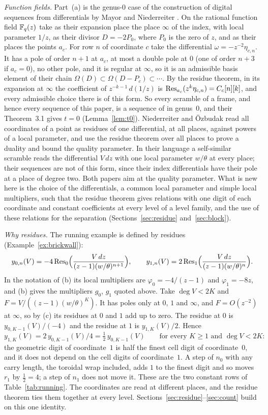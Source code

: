 \emph{Function fields.} Part~(a) is the genus-$0$ case of the construction of digital sequences from differentials by Mayor and Niederreiter \cite{MN07}. On the rational function field $\mathbb{F}_q(z)$ take as their expansion place the place $\infty$ of the index, with local parameter $1/z$, as their divisor $D=-2P_0$, where $P_0$ is the zero of $z$, and as their places the points $a_c$. For row $n$ of coordinate $c$ take the differential $\omega=-z^{-2}\eta_{c,n}$. It has a pole of order $n+1$ at $a_c$, at most a double pole at $0$ (one of order $n+3$ if $a_c=0$), no other pole, and it is regular at $\infty$, so it is an admissible basis element of their chain $\Omega(D)\subset\Omega(D-P_c)\subset\cdots$. By the residue theorem, in its expansion at $\infty$ the coefficient of $z^{-k-1}\,d(1/z)$ is $\operatorname{Res}_{a_c}(z^k\eta_{c,n})=C_c[n][k]$, and every admissible choice there is of this form. So every scramble of a frame, and hence every sequence of this paper, is a sequence of \cite{MN07} in genus~$0$, and their Theorem~3.1 gives $t=0$ (Lemma~\ref{lem:t0}). Niederreiter and \"Ozbudak \cite{NO07} read all coordinates of a point as residues of one differential, at all places, against powers of a local parameter, and use the residue theorem over all places to prove a duality and bound the quality parameter. In their language a self-similar scramble reads the differential $V\,dz$ with one local parameter $w/\theta$ at every place; their sequences are not of this form, since their index differentials have their pole at a place of degree two. Both papers aim at the quality parameter. What is new here is the choice of the differentials, a common local parameter and simple local multipliers, such that the residue theorem gives relations with one digit of each coordinate and constant coefficients at every level of a level family, and the use of these relations for the separation (Sections~\ref{sec:residue} and~\ref{sec:block}).

\emph{Why residues.} The running example is defined by residues (Example~\ref{ex:brickwall}):
\[
y_{0,n}(V)=-4\operatorname{Res}_0\Bigl(\frac{V\,dz}{(z-1)(w/\theta)^{n+1}}\Bigr),\qquad y_{1,n}(V)=2\operatorname{Res}_1\Bigl(\frac{V\,dz}{(z-1)(w/\theta)^{n}}\Bigr).
\]
In the notation of (b) its local multipliers are $\varphi_0=-4/(z-1)$ and $\varphi_1=-8z$, and (b) gives the multipliers $g_0$, $g_1$ quoted above. Take $\deg V<2K$ and $F=V/((z-1)(w/\theta)^K)$. It has poles only at $0$, $1$ and $\infty$, and $F=O(z^{-2})$ at $\infty$, so by (c) its residues at $0$ and $1$ add up to zero. The residue at $0$ is $y_{0,K-1}(V)/(-4)$ and the residue at $1$ is $y_{1,K}(V)/2$. Hence
\[
y_{1,K}(V)=2\,y_{0,K-1}(V)/4=\tfrac12\,y_{0,K-1}(V)\qquad\text{for every }K\ge1\text{ and }\deg V<2K:
\]
the geometric digit of coordinate~$1$ is half the finest cell digit of coordinate~$0$, and it does not depend on the cell digits of coordinate~$1$. A step of $n_0$ with any carry length, the toroidal wrap included, adds $1$ to the finest digit and so moves $r_1$ by $\frac12=4$; a step of $n_1$ does not move it. These are the two constant rows of Table~\ref{tab:running}. The coordinates are read at different places, and the residue theorem ties them together at every level. Sections~\ref{sec:residue}--\ref{sec:count} build on this one identity.


